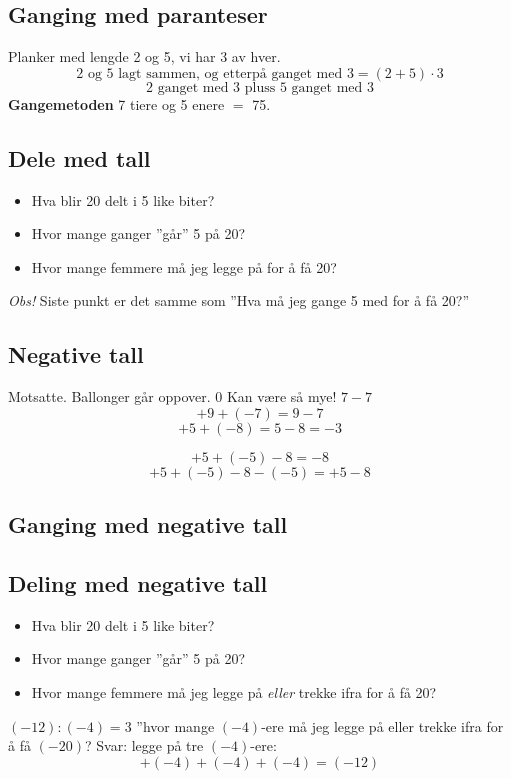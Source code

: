 \subsection{Ganging med paranteser}
Planker med lengde 2 og 5, vi har 3 av hver.
\[ \text{2 og 5 lagt sammen, og etterpå ganget med 3}=(2+5)\cdot3 \]
\[ \text{2 ganget med 3 pluss 5 ganget med 3} \]
\textbf{Gangemetoden}
7 tiere og 5 enere $ = $ 75.

\subsection{Dele med tall}
\begin{itemize}
	\item Hva blir 20 delt i 5 like biter?
	\item Hvor mange ganger ''går'' 5 på 20?
	\item Hvor mange femmere må jeg legge på for å få 20?
\end{itemize}
\textsl{Obs!} Siste punkt er det samme som ''Hva må jeg gange 5 med for å få 20?''
\subsection{Negative tall}
Motsatte. Ballonger går oppover.  0 Kan være så mye! $ 7-7 $
\[ +9+(-7)=9-7\]
\[ +5+(-8)=5-8=-3 \]

\[ +5+(-5)-8=-8 \]
\[ +5+(-5)-8-(-5)=+5-8 \]
\subsection{Ganging med negative tall}
\subsection{Deling med negative tall}
\begin{itemize}
	\item Hva blir 20 delt i 5 like biter?
	\item Hvor mange ganger ''går'' 5 på 20?
	\item Hvor mange femmere må jeg legge på \textit{eller} trekke ifra for å få 20?
\end{itemize}
${ (-12):(-4)  = 3}$ ''hvor mange $ (-4) $-ere må jeg legge på eller trekke ifra for å få $ (-20) $? Svar: legge på tre $ (-4) $-ere:
\[ +(-4)+(-4)+(-4)=(-12) \]

